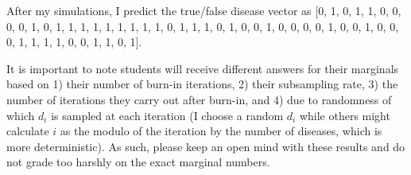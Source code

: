 After my simulations, I predict the true/false disease vector as [0, 1, 0, 1, 1, 0, 0, 0, 0, 1, 0, 1, 1, 1, 1, 1, 1, 1, 1, 1, 0, 1, 1, 1, 0, 1, 0, 0, 1, 0, 0, 0, 0, 1, 0, 0, 1, 0, 0, 0, 1, 1, 1, 1, 0, 0, 1, 1, 0, 1].

It is important to note students will receive different answers for their marginals based on 1) their number of burn-in iterations, 2) their subsampling rate, 3) the number of iterations they carry out after burn-in, and 4) due to randomness of which $d_i$ is sampled at each iteration (I choose a random $d_i$ while others might calculate $i$ as the modulo of the iteration by the number of diseases, which is more deterministic). As such, please keep an open mind with these results and do not grade too harshly on the exact marginal numbers.